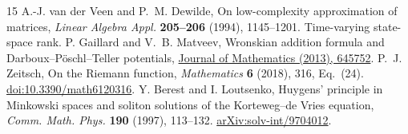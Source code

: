 \documentclass[11pt]{article}
\numberwithin{equation}{section}
\begin{document}
\begin{thebibliography}{15}
 A.-J. van der Veen and P.~M. Dewilde, On low-complexity approximation of matrices, \emph{Linear Algebra Appl.} \textbf{205--206} (1994), 1145--1201. Time-varying state-space rank.
 P. Gaillard and V.~B. Matveev, Wronskian addition formula and Darboux--P\"oschl--Teller potentials, \href{https://doi.org/10.1155/2013/645752}{Journal of Mathematics (2013), 645752}.
 P.~J. Zeitsch, On the Riemann function, \emph{Mathematics} \textbf{6} (2018), 316, Eq.~(24). \href{https://doi.org/10.3390/math6120316}{doi:10.3390/math6120316}.
 Y. Berest and I. Loutsenko, Huygens' principle in Minkowski spaces and soliton solutions of the Korteweg--de Vries equation, \emph{Comm. Math. Phys.} \textbf{190} (1997), 113--132. \href{https://arxiv.org/abs/solv-int/9704012}{arXiv:solv-int/9704012}.
\end{thebibliography}
\end{document}
